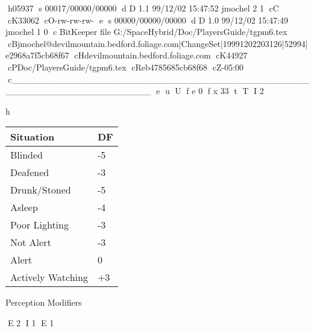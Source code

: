 h05937
s 00017/00000/00000
d D 1.1 99/12/02 15:47:52 jmochel 2 1
cC
cK33062
cO-rw-rw-rw-
e
s 00000/00000/00000
d D 1.0 99/12/02 15:47:49 jmochel 1 0
c BitKeeper file G:/SpaceHybrid/Doc/PlayersGuide/tgpm6.tex
cBjmochel@devilmountain.bedford.foliage.com|ChangeSet|19991202203126|52994|e2968a7f5cb68f67
cHdevilmountain.bedford.foliage.com
cK44927
cPDoc/PlayersGuide/tgpm6.tex
cReb4785685cb68f68
cZ-05:00
c______________________________________________________________________
e
u
U
f e 0
f x 33
t
T
I 2
\begin{SHTable}{h}
	\begin{tabular}{ll}
	Situation				&  DF \\ 
	\hline
	Blinded				     &  -5 \\
	Deafened				 &  -3 \\
	Drunk/Stoned			 &  -5 \\
	Asleep					 &  -4 \\
	Poor Lighting			 &  -3 \\
	Not Alert 				 &  -3 \\
	Alert					 &  0  \\
	Actively Watching		 & +3  \\ 
    \end{tabular}
	\caption{Perception Modifiers}\label{Table:PerceptionModifiers}
\end{SHTable}
E 2
I 1
E 1
